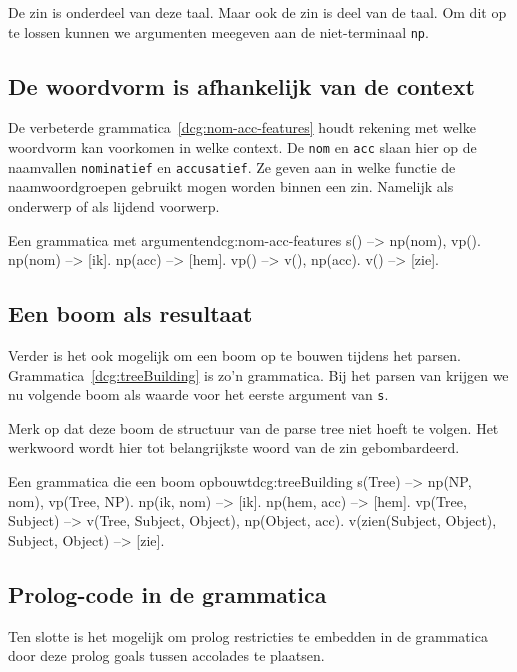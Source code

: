 De zin  is onderdeel van deze taal. Maar ook de zin  is deel van de taal. Om dit op te lossen kunnen we argumenten meegeven aan de niet-terminaal \texttt{np}.

\subsection{De woordvorm is afhankelijk van de context}
De verbeterde grammatica~\ref{dcg:nom-acc-features} houdt rekening met welke woordvorm kan voorkomen in welke context. De \texttt{nom} en \texttt{acc} slaan hier op de naamvallen \texttt{nominatief} en \texttt{accusatief}. Ze geven aan in welke functie de naamwoordgroepen gebruikt mogen worden binnen een zin. Namelijk als onderwerp of als lijdend voorwerp.

\begin{dcg}{Een grammatica met argumenten}{dcg:nom-acc-features}
s() --> np(nom), vp().
np(nom) --> [ik].
np(acc) --> [hem].
vp() --> v(), np(acc).
v() --> [zie].
\end{dcg}

\subsection{Een boom als resultaat}
Verder is het ook mogelijk om een boom op te bouwen tijdens het parsen. Grammatica~\ref{dcg:treeBuilding} is zo'n grammatica. Bij het parsen van  krijgen we nu volgende boom als waarde voor het eerste argument van \texttt{s}.


Merk op dat deze boom de structuur van de parse tree niet hoeft te volgen. Het werkwoord wordt hier tot belangrijkste woord van de zin gebombardeerd.
\begin{dcg}{Een grammatica die een boom opbouwt}{dcg:treeBuilding}
s(Tree) --> np(NP, nom), vp(Tree, NP).
np(ik, nom) --> [ik].
np(hem, acc) --> [hem].
vp(Tree, Subject) --> v(Tree, Subject, Object), np(Object, acc).
v(zien(Subject, Object), Subject, Object) --> [zie].
\end{dcg} 

\subsection{Prolog-code in de grammatica}
Ten slotte is het mogelijk om prolog restricties te embedden in de grammatica door deze prolog goals tussen accolades te plaatsen.

